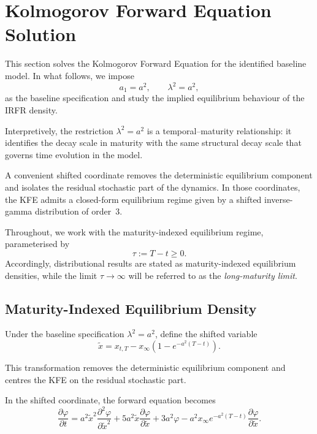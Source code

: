 \documentclass[12pt]{article}
\theoremstyle{statementstyle}
\begin{document}
\section{Kolmogorov Forward Equation Solution}
\label{sec:kfe-solution}

This section solves the Kolmogorov Forward Equation for the identified
baseline model. In what follows, we impose
\[
a_{1}=a^{2},
\qquad
\lambda^{2}=a^{2},
\]
as the baseline specification and study the implied equilibrium behaviour of
the IRFR density.

Interpretively, the restriction \(\lambda^{2}=a^{2}\) is a temporal--maturity relationship: it identifies the decay scale in maturity with the
same structural decay scale that governs time evolution in the model.

A convenient shifted coordinate removes the deterministic equilibrium
component and isolates the residual stochastic part of the dynamics. In
those coordinates, the KFE admits a closed-form equilibrium regime given
by a shifted inverse-gamma distribution of order~3.

Throughout, we work with the maturity-indexed equilibrium regime,
parameterised by
\[
\tau:=T-t\ge 0.
\]
Accordingly, distributional results are stated as maturity-indexed
equilibrium densities, while the limit \(\tau\to\infty\) will be
referred to as the \emph{long-maturity limit}.

\subsection{Maturity-Indexed Equilibrium Density}

Under the baseline specification \(\lambda^{2}=a^{2}\), define the shifted variable
\[
\widetilde{x}
=
x_{t,T}
-
x_{\infty}\!\left(1-e^{-a^{2}(T-t)}\right).
\]

This transformation removes the deterministic equilibrium component and centres the
KFE on the residual stochastic part.

In the shifted coordinate, the forward equation becomes
\begin{equation}
\frac{\partial \varphi}{\partial t}
=
a^{2}\widetilde{x}^{2}\frac{\partial^{2}\varphi}{\partial \widetilde{x}^{2}}
+
5a^{2}\widetilde{x}\frac{\partial \varphi}{\partial \widetilde{x}}
+
3a^{2}\varphi
-
a^{2}x_{\infty}e^{-a^{2}(T-t)}\frac{\partial \varphi}{\partial \widetilde{x}}.
\tag{4.1.1}
\end{equation}
\end{document}
